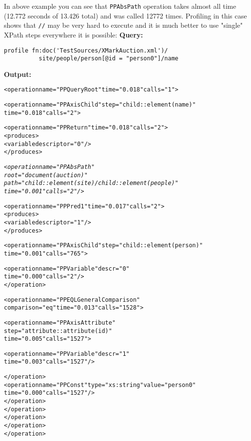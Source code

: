 \documentclass[a4paper,12pt]{article}
\begin{document}
In above example you can see that \verb!PPAbsPath! operation takes almost all time (12.772 seconds of 13.426 total) and was called 12772 times. Profiling in this
case shows that \verb!//! may be very hard to execute and it is much better to use "single" XPath steps everywhere it is possible:
\newline
\newline
\textbf{Query:}
\begin{verbatim}
profile fn:doc('TestSources/XMarkAuction.xml')/
          site/people/person[@id = "person0"]/name
\end{verbatim}
\textbf{Output:}

\begin{alltt}
<operation name="PPQueryRoot" time="0.018" calls="1">

  <operation name="PPAxisChild" step="child::element(name)" 
                                time="0.018" calls="2">
  
    <operation name="PPReturn" time="0.018" calls="2">
      <produces>
        <variable descriptor="0"/>
      </produces>

      \emph{<operation name="PPAbsPath" 
                 root="document(auction)" 
                 path="child::element(site)/child::element(people)"
                 time="0.001" calls="2"/>}

      <operation name="PPPred1" time="0.017" calls="2">
        <produces>
          <variable descriptor="1"/>
        </produces>
        
        <operation name="PPAxisChild" step="child::element(person)" 
                                      time="0.001" calls="765">

          <operation name="PPVariable" descr="0"
                     time="0.000" calls="2"/>
        </operation>

        <operation name="PPEQLGeneralComparison"
                   comparison="eq" time="0.013" calls="1528">
                   
          <operation name="PPAxisAttribute" 
                     step="attribute::attribute(id)" 
                     time="0.005" calls="1527">

            <operation name="PPVariable" descr="1" 
                       time="0.003" calls="1527"/>
                       
          </operation>
          <operation name="PPConst" type="xs:string" value="person0"
                                    time="0.000" calls="1527"/>
        </operation>
      </operation>
    </operation>
  </operation>
</operation>
\end{alltt}
\end{document}
